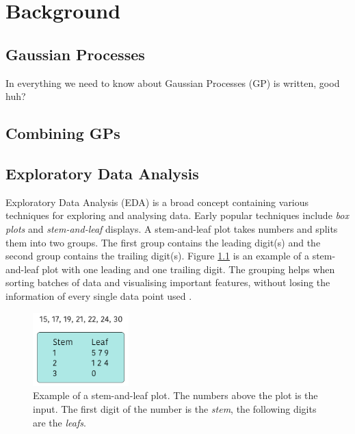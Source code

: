 \chapter{Background}
\label{cha:background}

\section{Gaussian Processes}
In \cite{Rasmussen2004} everything we need to know about Gaussian Processes (GP) is written, good huh? 

\section{Combining GPs}

\section{Exploratory Data Analysis}
Exploratory Data Analysis (EDA) is a broad concept containing various techniques \cite{Anselin1999, Gelman2003, Hoaglin2003, Tukey1977, Velleman1981} for exploring and analysing data.
Early popular techniques include \emph{box plots} and \emph{stem-and-leaf} displays.
A stem-and-leaf plot takes numbers and splits them into two groups.
The first group contains the leading digit(s) and the second group contains the trailing digit(s).
Figure \ref{fig:stem-leaf-plot} is an example of a stem-and-leaf plot with one leading and one trailing digit.
The grouping helps when sorting batches of data and visualising important features, without losing the information of every single data point used \cite{Velleman1981}.

\begin{figure} [h!]
    \centering
    \includegraphics[width=0.33\textwidth]{figures/stem-leaf-plot}
    \caption{Example of a stem-and-leaf plot. The numbers above the plot is the input.
    The first digit of the number is the \emph{stem}, the following digits are the \emph{leafs}.}
    \label{fig:stem-leaf-plot}
\end{figure}

